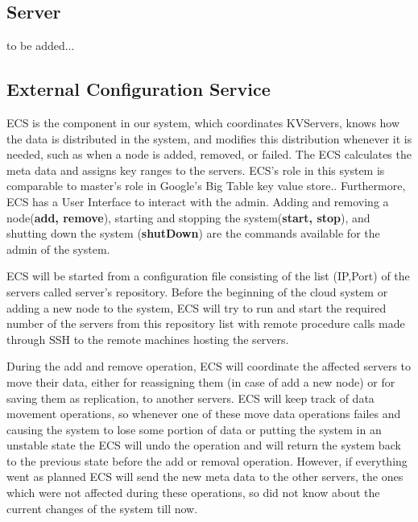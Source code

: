 \documentclass{sig-alternate}
\begin{document}
\subsection{Server}\label{serverimpl}
to be added...
\subsection{External Configuration Service}
ECS is the component in our system, which coordinates KVServers, knows how the data is distributed in the system, and modifies this distribution whenever it is needed, such as when a node is added, removed, or failed. The ECS calculates the meta data and assigns key ranges to the servers. ECS's role in this system is comparable to master's role in Google's Big Table key value store.\cite{bigTable}. Furthermore, ECS has a User Interface to interact with the admin. Adding and removing a node(\textbf{add, remove}), starting and stopping the system(\textbf{start, stop}), and shutting down the system (\textbf{shutDown}) are the commands available for the admin of the system.

ECS will be started from a configuration file consisting of the list (IP,Port) of the servers called server's repository. Before the beginning of the cloud system or adding a new node to the system, ECS will try to run and start the required number of the servers from this repository list with  remote procedure calls made through SSH to the remote machines hosting the servers. 

During the add and remove operation, ECS will coordinate the affected servers to move their data, either for reassigning them (in case of add a new node) or for saving them as replication, to another servers. ECS will keep track of data movement operations, so whenever one of these move data operations failes and causing the system to lose some portion of data or putting the system in an unstable state the ECS will undo the operation and will return the system back to the previous state before the add  or removal operation. However, if everything went as planned ECS will send the new meta data to the other servers, the ones which were not affected during these operations, so did not know about the current changes of the system till now.
\end{document}
